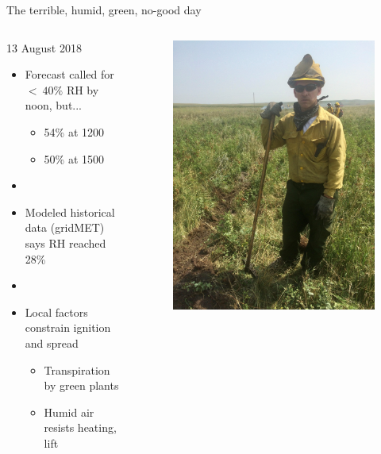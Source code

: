 \documentclass[11pt]{beamer}
\begin{document}
\begin{frame}{The terrible, humid, green, no-good day}
	
	\begin{columns}
		\begin{column}{0.6\textwidth}
	\alert{13 August 2018}
	\begin{itemize} 
		\item Forecast called for $<~40\%$ RH by noon, but...
		\begin{itemize}
			\item 54\% at 1200
			\item 50\% at 1500
		\end{itemize}
	\item[]
		\item Modeled historical data (gridMET) says RH reached 28\%
	\item[]
		\item Local factors constrain ignition and spread
				\begin{itemize}
			\item Transpiration by green plants
			\item Humid air resists heating, lift
		\end{itemize}
		
	\end{itemize}
	
		\end{column}
		\begin{column}{0.4\textwidth}  
			\begin{center}
				\begin{figure}
					\includegraphics[width=0.9\linewidth]{figs/TorreGreenFuel} 
					

\end{figure}
\end{center}
\end{column}
\end{columns}
\end{frame}
\end{document}
